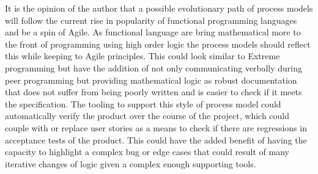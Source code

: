 \documentclass{style/CRPITStyle}
\begin{document}
It is the opinion of the author that a possible evolutionary path of process
models will follow the current rise in popularity of functional programming
languages and be a spin of Agile. As functional language are bring mathematical
more to the front of programming using high order logic the process models
should reflect this while keeping to Agile principles. This could look similar
to Extreme programming but have the addition of not only communicating verbally 
during peer programming but providing mathematical logic as robust documentation
that does not suffer from being poorly written and is easier to check if it
meets the specification. The tooling to support this style of process model could
automatically verify the product over the course of the project, which could
couple with or replace user stories as a means to check if there are regressions in
acceptance tests of the product. This could have the added benefit of having the
capacity to highlight a complex bug or edge cases that could result of many 
iterative changes of logic given a complex enough supporting tools.



\end{document}
